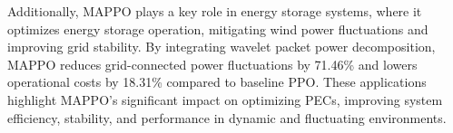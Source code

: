 Additionally, MAPPO plays a key role in energy storage systems, where it optimizes energy storage operation, mitigating wind power fluctuations and improving grid stability. By integrating wavelet packet power decomposition, MAPPO reduces grid-connected power fluctuations by 71.46\% and lowers operational costs by 18.31\% compared to baseline PPO. These applications highlight MAPPO's significant impact on optimizing PECs, improving system efficiency, stability, and performance in dynamic and fluctuating environments.




